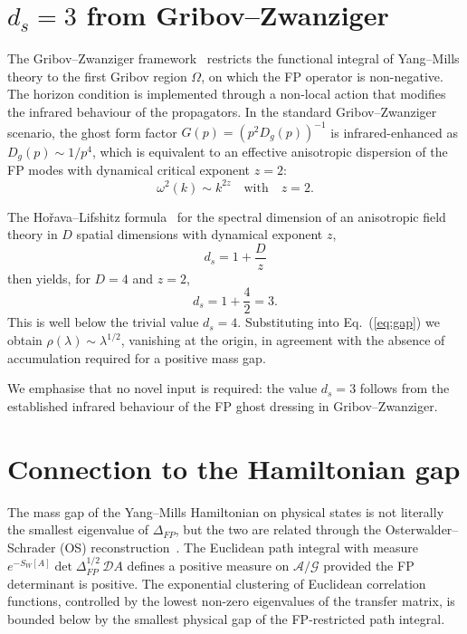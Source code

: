 \documentclass[aps,prl,reprint,nofootinbib,superscriptaddress,floatfix]{revtex4-2}
\begin{document}
\section{$d_s = 3$ from Gribov--Zwanziger}

The Gribov--Zwanziger framework~\cite{Zwanziger1989,DellAntonioZwanziger1991} restricts the functional integral of Yang--Mills theory to the first Gribov region $\Omega$, on which the FP operator is non-negative. The horizon condition is implemented through a non-local action that modifies the infrared behaviour of the propagators. In the standard Gribov--Zwanziger scenario, the ghost form factor $G(p) = (p^2 D_g(p))^{-1}$ is infrared-enhanced as $D_g(p) \sim 1/p^4$, which is equivalent to an effective anisotropic dispersion of the FP modes with dynamical critical exponent $z = 2$:
\begin{equation}
\omega^2(k) \sim k^{2z} \quad \text{with} \quad z = 2.
\end{equation}

The Ho\v rava--Lifshitz formula~\cite{Horava2009} for the spectral dimension of an anisotropic field theory in $D$ spatial dimensions with dynamical exponent $z$,
\begin{equation}
\boxed{ \; d_s = 1 + \frac{D}{z} \; }
\label{eq:Horava}
\end{equation}
then yields, for $D = 4$ and $z = 2$,
\begin{equation}
d_s = 1 + \frac{4}{2} = 3.
\end{equation}
This is well below the trivial value $d_s = 4$. Substituting into Eq.~(\ref{eq:gap}) we obtain $\rho(\lambda) \sim \lambda^{1/2}$, vanishing at the origin, in agreement with the absence of accumulation required for a positive mass gap.

We emphasise that no novel input is required: the value $d_s = 3$ follows from the established infrared behaviour of the FP ghost dressing in Gribov--Zwanziger.

\section{Connection to the Hamiltonian gap}

The mass gap of the Yang--Mills Hamiltonian on physical states is not literally the smallest eigenvalue of $\Delta_{FP}$, but the two are related through the Osterwalder--Schrader (OS) reconstruction~\cite{OsterwalderSchrader}. The Euclidean path integral with measure $e^{-S_W[A]} \det \Delta_{FP}^{1/2} \, \mathcal{D}A$ defines a positive measure on $\mathcal{A}/\mathcal{G}$ provided the FP determinant is positive. The exponential clustering of Euclidean correlation functions, controlled by the lowest non-zero eigenvalues of the transfer matrix, is bounded below by the smallest physical gap of the FP-restricted path integral.
\end{document}
